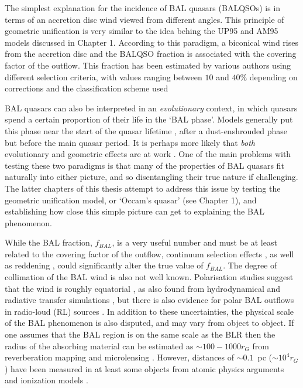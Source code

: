 The simplest explanation for the incidence of 
BAL quasars (BALQSOs) is in terms of an accretion disc wind viewed
from different angles. This principle of geometric unification
is very similar to the idea behing the UP95 and AM95 models discussed in Chapter 1.
According to this paradigm, a biconical wind rises from 
the accretion disc and the BALQSO fraction is associated with
the covering factor of the outflow. This fraction
has been estimated by various authors using different selection criteria, with
values ranging between $10$ and $40\%$ depending on corrections 
and the classification scheme used 
\citep{weymann1991, trump2006, knigge2008, dai2008, allen2011}

BAL quasars can also be interpreted in an {\em evolutionary}
context, in which quasars spend a certain proportion of their life
in the `BAL phase'. Models generally put this phase near the start
of the quasar lifetime \citep{hazard1984,surdej1987,boroson1992,zubovas2013}, 
after a dust-enshrouded phase but before
the main quasar period. It is perhaps more likely that {\em both} 
evolutionary and geometric effects are at work \citep{borguet2010,dai2012}.
One of the main problems with testing these two paradigms is that many of
the properties of BAL quasars fit naturally into either picture, and so
disentangling their true nature if challenging. 
The latter chapters of this thesis attempt to address this issue by testing the 
geometric unification model, or `Occam's quasar' (see Chapter 1),
and establishing how close this simple picture can get to explaining 
the BAL phenomenon.  

While the BAL fraction, $f_{BAL}$, is a very useful number and must be at least
related to the covering factor of the outflow, continuum selection
effects \citep{goodrich1997,krolikvoit1998}, 
as well as reddening \citep{allen2011}, could significantly
alter the true value of $f_{BAL}$. The degree of collimation of the BAL wind
is also not well known. Polarisation studies suggest that the 
wind is roughly equatorial \citep{goodrich1995, cohen1995}, 
as also found from hydrodynamical and radiative transfer simulations 
\citep{PSK2000,PK04, higginbottom2013},
but there is also evidence for polar BAL outflows in 
radio-loud (RL) sources \citep{zhou2006,ghoshpunsly2007}.
In addition to these uncertainties, the physical scale of the BAL
phenomenon is also disputed, and may vary from object to object.
If one assumes that the BAL region is on the same scale as 
the BLR then the radius of the absorbing material
can be estimated as $\sim 100-1000 r_G$ from reverberation mapping
and microlensing \citep[e.g., for BLRs in BALQSOs,][]{sluse2015,odowd2015}.
However, distances of  $\sim0.1$~pc ($\sim 10^4 r_G$) have been measured in at least 
some objects from atomic physics arguments and ionization models
\citep{borguet2013,chamberlain2015}.

